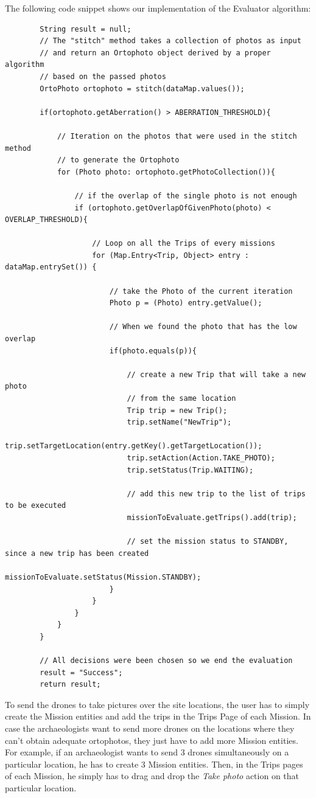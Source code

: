 The following code snippet shows our implementation of the Evaluator algorithm:
\\
\begin{lstlisting}
		String result = null;
		// The "stitch" method takes a collection of photos as input
        // and return an Ortophoto object derived by a proper algorithm
        // based on the passed photos
		OrtoPhoto ortophoto = stitch(dataMap.values());
		
		if(ortophoto.getAberration() > ABERRATION_THRESHOLD){
			
			// Iteration on the photos that were used in the stitch method
            // to generate the Ortophoto
			for (Photo photo: ortophoto.getPhotoCollection()){
				
				// if the overlap of the single photo is not enough
				if (ortophoto.getOverlapOfGivenPhoto(photo) < OVERLAP_THRESHOLD){
					
					// Loop on all the Trips of every missions
					for (Map.Entry<Trip, Object> entry : dataMap.entrySet()) {
						
						// take the Photo of the current iteration
						Photo p = (Photo) entry.getValue();
						
						// When we found the photo that has the low overlap
						if(photo.equals(p)){
							
							// create a new Trip that will take a new photo
                            // from the same location
							Trip trip = new Trip();
							trip.setName("NewTrip");
							trip.setTargetLocation(entry.getKey().getTargetLocation());
							trip.setAction(Action.TAKE_PHOTO);
							trip.setStatus(Trip.WAITING);

							// add this new trip to the list of trips to be executed
							missionToEvaluate.getTrips().add(trip);
							
							// set the mission status to STANDBY, since a new trip has been created
							missionToEvaluate.setStatus(Mission.STANDBY);
						}
					}		
				}
			}
		}
        
        // All decisions were been chosen so we end the evaluation
		result = "Success";
		return result;
\end{lstlisting}

To send the drones to take pictures over the site locations, the user has to simply create the Mission entities and add the trips in the Trips Page of each Mission.
In case the archaeologists want to send more drones on the locations where they can't obtain adequate ortophotos, they just have to add more Mission entities.
For example, if an archaeologist wants to send 3 drones simultaneously on a particular location, he has to create 3 Mission entities.
Then, in the Trips pages of each Mission, he simply has to drag and drop the \textit{Take photo} action on that particular location.
\\

